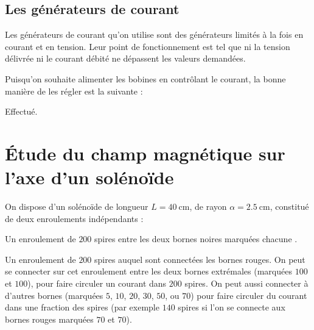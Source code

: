 \documentclass[a4paper,french,bookmarks]{article}
\begin{document}
    \subsection{Les générateurs de courant}\label{subsec:1.2}
    
    Les générateurs de courant qu'on utilise sont des générateurs limités à la fois en courant et en tension. Leur point de fonctionnement est tel que ni la tension délivrée ni le courant débité ne dépassent les valeurs demandées.\medskip
    
    Puisqu'on souhaite alimenter les bobines en contrôlant le courant, la bonne manière de les régler est la suivante :
    
    \noafter
    \nobefore\yesafter
    \begin{expcom}
        Effectué.
    \end{expcom}
    \yesbefore
    
    \section{Étude du champ magnétique sur l'axe d'un solénoïde}
    
    On dispose d'un solénoïde de longueur $L = \SI{40}{\cm}$, de rayon $\alpha = \SI{2.5}{\cm}$, constitué de deux enroulements indépendants :
    \begin{enumerate}
        \itt Un enroulement de $200$ spires entre les deux bornes noires marquées chacune .
        
        \itt Un enroulement de $200$ spires auquel sont connectées les bornes rouges. On peut se connecter sur cet enroulement entre les deux bornes extrémales (marquées $100$ et $100$), pour faire circuler un courant dans $200$ spires. On peut aussi connecter à d'autres bornes (marquées $5$, $10$, $20$, $30$, $50$, ou $70$) pour faire circuler du courant dans une fraction des spires (par exemple $140$ spires si l'on se connecte aux bornes rouges marquées $70$ et $70$).
    \end{enumerate}
    
\end{document}
